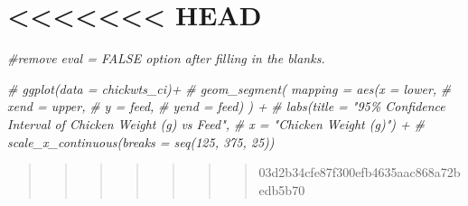 \documentclass[
]{article}
\newenvironment{Shaded}{\begin{snugshade}}{\end{snugshade}}
\newcommand{\CommentTok}[1]{\textcolor[rgb]{0.56,0.35,0.01}{\textit{#1}}}
\begin{document}
\section{\textless\textless\textless\textless\textless\textless\textless{}
HEAD}\label{head}

\begin{Shaded}
\begin{Highlighting}[]
    \CommentTok{\#remove eval = FALSE option after filling in the blanks.}
    
    \CommentTok{\# ggplot(data = chickwts\_ci)+}
    \CommentTok{\#   geom\_segment( mapping = aes(x = lower, }
    \CommentTok{\#                               xend = upper,}
    \CommentTok{\#                               y = feed,}
    \CommentTok{\#                               yend = feed) ) +}
    \CommentTok{\#   labs(title = "95\% Confidence Interval of Chicken Weight (g) vs Feed",}
    \CommentTok{\#            x = "Chicken Weight (g)") +}
    \CommentTok{\#   scale\_x\_continuous(breaks = seq(125, 375, 25))}
\end{Highlighting}
\end{Shaded}

\begin{quote}
\begin{quote}
\begin{quote}
\begin{quote}
\begin{quote}
\begin{quote}
\begin{quote}
03d2b34cfe87f300efb4635aac868a72bedb5b70
\end{quote}
\end{quote}
\end{quote}
\end{quote}
\end{quote}
\end{quote}
\end{quote}
\end{document}
